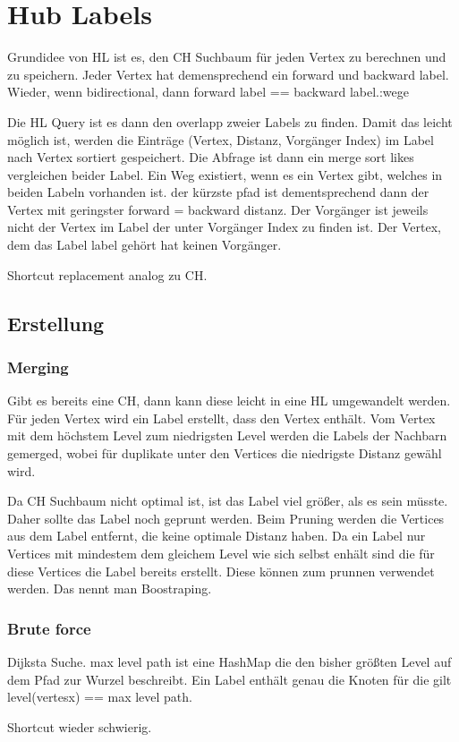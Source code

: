 \chapter{Hub Labels}

Grundidee von HL ist es, den CH Suchbaum für jeden Vertex zu berechnen und zu speichern.
Jeder Vertex hat demensprechend ein forward und backward label.
Wieder, wenn bidirectional, dann forward label == backward label.:wege

Die HL Query ist es dann den overlapp zweier Labels zu finden.
Damit das leicht möglich ist, werden die Einträge (Vertex, Distanz, Vorgänger Index) im Label nach Vertex sortiert gespeichert.
Die Abfrage ist dann ein merge sort likes vergleichen beider Label. Ein Weg existiert, wenn es ein Vertex gibt, welches in beiden Labeln vorhanden ist.
der kürzste pfad ist dementsprechend dann der Vertex mit geringster forward = backward distanz.
Der Vorgänger ist jeweils nicht der Vertex im Label der unter Vorgänger Index zu finden ist. Der Vertex, dem das Label label gehört hat keinen Vorgänger.

Shortcut replacement analog zu CH.

\section{Erstellung}

\subsection{Merging}
Gibt es bereits eine CH, dann kann diese leicht in eine HL umgewandelt werden.
Für jeden Vertex wird ein Label erstellt, dass den Vertex enthält.
Vom Vertex mit dem höchstem Level zum niedrigsten Level werden die Labels der Nachbarn gemerged, wobei für duplikate unter den Vertices die niedrigste Distanz gewähl wird.

Da CH Suchbaum nicht optimal ist, ist das Label viel größer, als es sein müsste. Daher sollte das Label noch geprunt werden.
Beim Pruning werden die Vertices aus dem Label entfernt, die keine optimale Distanz haben.
Da ein Label nur Vertices mit mindestem dem gleichem Level wie sich selbst enhält sind die für diese Vertices die Label bereits erstellt.
Diese können zum prunnen verwendet werden.
Das nennt man Boostraping.

\subsection{Brute force}
Dijksta Suche.
max level path ist eine HashMap die den bisher größten Level auf dem Pfad zur Wurzel beschreibt.
Ein Label enthält genau die Knoten für die gilt level(vertesx) == max level path.

Shortcut wieder schwierig.
